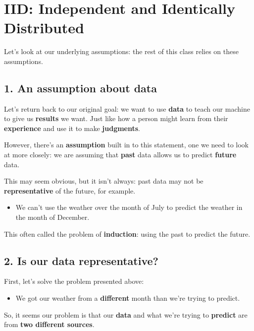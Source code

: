 \section*{IID: Independent and Identically Distributed}

Let's look at our underlying assumptions: the rest of this class relies on these assumptions.
    
    \subsection*{1. An assumption about data}
        
        Let's return back to our original goal: we want to use \textbf{data} to teach our machine to give us \textbf{results} we want. Just like how a person might learn from their \textbf{experience} and use it to make \textbf{judgments}.
        
        However, there's an \textbf{assumption} built in to this statement, one we need to look at more closely: we are assuming that \textbf{past} data allows us to predict \textbf{future} data. 
        
        This may seem obvious, but it isn't always: past data may not be \textbf{representative} of the future, for example.
        
        \begin{itemize}
            \item \miniex We can't use the weather over the month of July to predict the weather in the month of December.
        \end{itemize}
        
        This often called the problem of \textbf{induction}: using the past to predict the future.
        
        
    \subsection*{2. Is our data representative?}
    
        First, let's solve the problem presented above:
        
        \begin{itemize}
            \item \miniex We got our weather from a \textbf{different} month than we're trying to predict.
        \end{itemize} 
        
        So, it seems our problem is that our \textbf{data} and what we're trying to \textbf{predict} are from \textbf{two different sources}.
        
